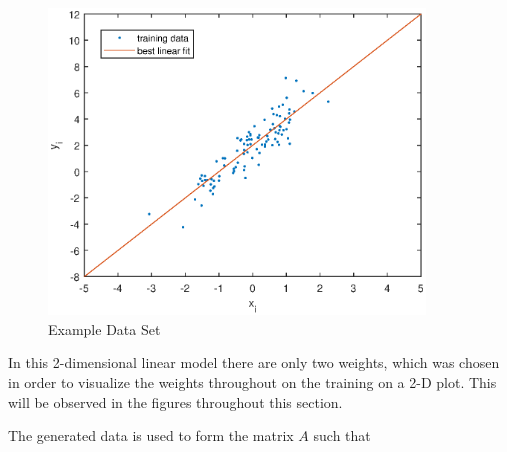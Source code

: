 \documentclass[11pt, fullpage,letterpaper]{article}
\begin{document}
\begin{enumerate}
  \begin{figure}[ht]
\begin{center}
\advance\leftskip-3cm
\advance\rightskip-3cm
\includegraphics[width=10cm]{Figure_LR_data.eps}
\caption{Example Data Set}
\end{center}\end{figure}

In this 2-dimensional linear model there are only two weights, which was chosen in order to visualize the weights throughout on the training on a 2-D plot. This will be observed in the figures throughout this section.

The generated data is used to form the matrix $A$ such that


\end{enumerate}
\end{document}
